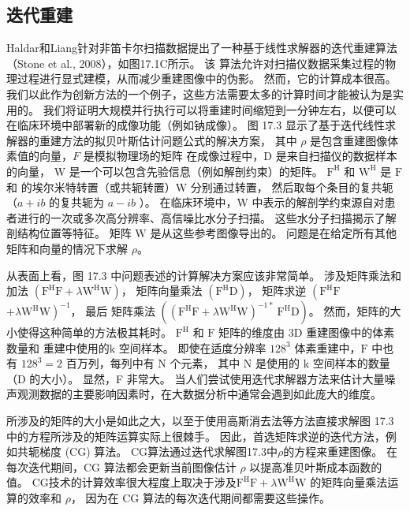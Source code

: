 \subsection{迭代重建}
Haldar和Liang针对非笛卡尔扫描数据提出了一种基于线性求解器的迭代重建算法（Stone et al., 2008），如图17.1C所示。 该
算法允许对扫描仪数据采集过程的物理过程进行显式建模，从而减少重建图像中的伪影。 然而，它的计算成本很高。 
我们以此作为创新方法的一个例子，这些方法需要太多的计算时间才能被认为是实用的。 
我们将证明大规模并行执行可以将重建时间缩短到一分钟左右，以便可以在临床环境中部署新的成像功能（例如钠成像）。 
图 17.3 显示了基于迭代线性求解器的重建方法的拟贝叶斯估计问题公式的解决方案，
其中 $\rho$ 是包含重建图像体素值的向量，$F$ 是模拟物理场的矩阵 在成像过程中，D 是来自扫描仪的数据样本的向量，
$\mathrm{W}$ 是一个可以包含先验信息（例如解剖约束）的矩阵。 $\mathrm{F}^{\mathrm{H}}$ 和 $\mathrm{W}^{\mathrm{H}}$ 是 $\mathrm{F}$ 和 $ 的埃尔米特转置（或共轭转置） \mathrm{W}$ 分别通过转置，
然后取每个条目的复共轭（$a+i b$ 的复共轭为 $a-i b$ ）。 
在临床环境中，$\mathrm{W}$ 中表示的解剖学约束源自对患者进行的一次或多次高分辨率、高信噪比水分子扫描。 
这些水分子扫描揭示了解剖结构位置等特征。 矩阵 $\mathrm{W}$ 是从这些参考图像导出的。 
问题是在给定所有其他矩阵和向量的情况下求解 $\rho$。

从表面上看，图 17.3 中问题表述的计算解决方案应该非常简单。 
涉及矩阵乘法和加法 $\left(\mathrm{F}^{\mathrm{H}} \mathrm{F}+\lambda \mathrm{W}^{\mathrm{H}} \mathrm{W}\right)$，
矩阵向量乘法 $\left(\mathrm{F}^{\mathrm{H}} \mathrm{D}\right)$，
矩阵求逆 $\left(\mathrm{F}^{\mathrm {H}} \mathrm{F}\right.$ $\left.+\lambda \mathrm{W}^{\mathrm{H}} \mathrm{W}\right)^{-1}$，
最后 矩阵乘法 $\left(\left(\mathrm{F}^{\mathrm{H}} \mathrm{F}+\lambda \mathrm{W}^{\mathrm{H}} \mathrm{W}\right )^{-1 *} \mathrm{~F}^{\mathrm{H}} \mathrm{D}\right)$。 
然而，矩阵的大小使得这种简单的方法极其耗时。 
$\mathrm{F}^{\mathrm{H}}$ 和 $\mathrm{F}$ 矩阵的维度由 $3 \mathrm{D}$ 重建图像中的体素数量和 重建中使用的$\mathrm{k}$ 空间样本。 
即使在适度分辨率 $128^{3}$ 体素重建中，$\mathrm{F}$ 中也有 $128^{3}=2$ 百万列，每列中有 $\mathrm{N}$ 个元素，
其中 $ \mathrm{N}$ 是使用的 $\mathrm{k}$ 空间样本的数量（D 的大小）。 显然，F 非常大。 
当人们尝试使用迭代求解器方法来估计大量噪声观测数据的主要影响因素时，在大数据分析中通常会遇到如此庞大的维度。

所涉及的矩阵的大小是如此之大，以至于使用高斯消去法等方法直接求解图 17.3 中的方程所涉及的矩阵运算实际上很棘手。 
因此，首选矩阵求逆的迭代方法，例如共轭梯度 (CG) 算法。 CG算法通过迭代求解图17.3中$\rho$的方程来重建图像。 
在每次迭代期间，CG 算法都会更新当前图像估计 $\rho$ 以提高准贝叶斯成本函数的值。 
CG技术的计算效率很大程度上取决于涉及$\mathrm{F}^{\mathrm{H}} \mathrm{F}+\lambda \mathrm{W}^{\mathrm{H}} \mathrm{W}$ 的矩阵向量乘法运算的效率和 $\rho$，
因为在 $\mathrm{CG}$ 算法的每次迭代期间都需要这些操作。

